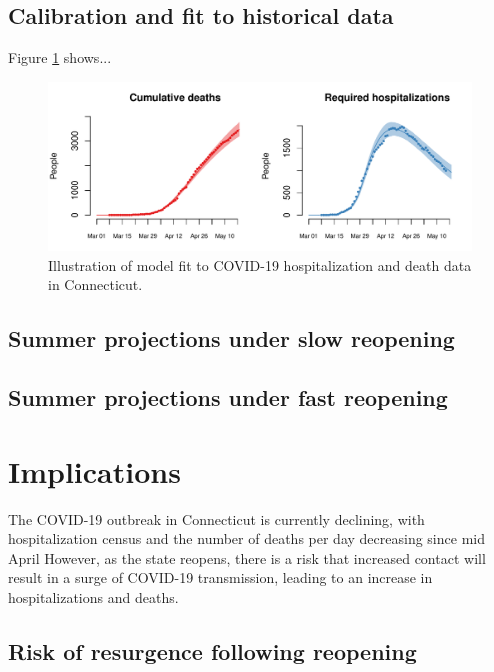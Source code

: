 \documentclass[11pt]{article}
\newcommand{\comment}[1]{[\textcolor{red}{#1}]}
\begin{document}
\subsection*{Calibration and fit to historical data}


Figure \ref{fig:calibration} shows...



\begin{figure}
\centering
\includegraphics[width=.9\textwidth]{figures/calibration.pdf}
\caption{Illustration of model fit to COVID-19 hospitalization and death data in Connecticut. }
\label{fig:calibration}
\end{figure}


\subsection*{Summer projections under slow reopening} 




\subsection*{Summer projections under fast reopening} 






\section*{Implications}

The COVID-19 outbreak in Connecticut is currently declining, with hospitalization census and the number of deaths per day decreasing since mid April  However, as the state reopens, there is a risk that increased contact will result in a surge of COVID-19 transmission, leading to an increase in hospitalizations and deaths. 


\subsection*{Risk of resurgence following reopening} 
\end{document}
